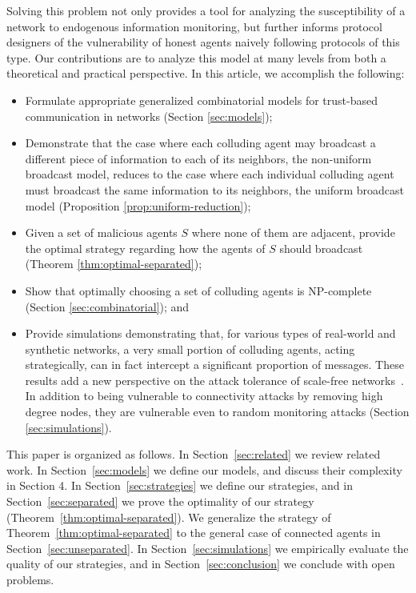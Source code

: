 \documentclass{comnet}
\begin{document}
Solving this problem not only provides a tool for analyzing the susceptibility of a network to endogenous information monitoring, but further informs protocol designers of the vulnerability of honest agents naively following protocols of this type. Our contributions are to analyze this model at many levels from both a theoretical and practical perspective. In this article, we accomplish the following:
\begin{itemize}
\item Formulate appropriate generalized combinatorial models for trust-based communication in networks (Section \ref{sec:models});
\item Demonstrate that the case where each colluding agent may broadcast a different piece of information to each of its neighbors, the non-uniform broadcast model, reduces to the case where each individual colluding agent must broadcast the same information to its neighbors, the uniform broadcast model (Proposition \ref{prop:uniform-reduction});
\item Given a set of malicious agents $S$ where none of them are adjacent, provide the optimal strategy regarding how the agents of $S$ should broadcast (Theorem \ref{thm:optimal-separated});
\item Show that optimally choosing a set of colluding agents is NP-complete (Section \ref{sec:combinatorial}); and 
\item Provide simulations demonstrating that, for various types of real-world and synthetic networks, a very small portion of colluding agents, acting strategically,  can in fact intercept a significant proportion of messages. These results add a new perspective on the attack tolerance of scale-free networks~\cite{AlbertJB00}. In addition to being vulnerable to connectivity attacks by removing high degree nodes, they are vulnerable even to random monitoring attacks (Section \ref{sec:simulations}).
\end{itemize} 

This paper is organized as follows. In Section~\ref{sec:related} we review 
related work. In Section~\ref{sec:models} we define our models, and discuss their complexity in Section 4. In Section~\ref{sec:strategies} we define
our strategies, and in Section~\ref{sec:separated} we prove the optimality of our strategy (Theorem~\ref{thm:optimal-separated}). We generalize the strategy of Theorem~\ref{thm:optimal-separated} to
the general case of connected agents in Section~\ref{sec:unseparated}. In
Section~\ref{sec:simulations} we empirically evaluate the quality of our
strategies, and in Section~\ref{sec:conclusion} we conclude with open problems.
\end{document}
